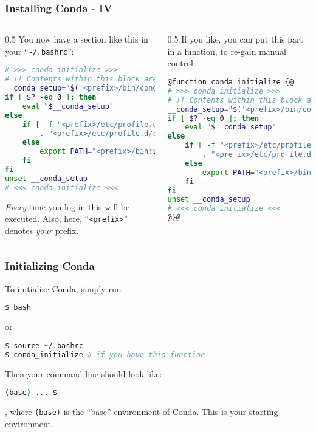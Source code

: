 \begin{frame}[fragile]
  \frametitle{Installing Conda - IV}
  \footnotesize
  \begin{columns}[t]
    \begin{column}{0.5\textwidth}
       You now have a section like this in your ``\texttt{\textasciitilde/.bashrc}'':
       \begin{lstlisting}[language=Bash, style=Shell, basicstyle=\tiny, breaklines=true]
# >>> conda initialize >>>
# !! Contents within this block are managed by 'conda init' !!
__conda_setup="$('<prefix>/bin/conda' 'shell.bash' 'hook' 2> /dev/null)"
if [ $? -eq 0 ]; then
    eval "$__conda_setup"
else
    if [ -f "<prefix>/etc/profile.d/conda.sh" ]; then
        . "<prefix>/etc/profile.d/conda.sh"
    else
        export PATH="<prefix>/bin:$PATH"
    fi
fi
unset __conda_setup
# <<< conda initialize <<<
      \end{lstlisting}
      \bcattention \emph{Every} time you log-in this will be executed. Also, here, ``\texttt{<prefix>}'' denotes \emph{your} prefix.
    \end{column}
    \begin{column}{0.5\textwidth}
       \pause
       If you like, you can put this part in a function, to re-gain manual control:
       \begin{lstlisting}[language=Bash, style=Shell, basicstyle=\tiny, breaklines=true]
@function conda_initialize {@
# >>> conda initialize >>>
# !! Contents within this block are managed by 'conda init' !!
__conda_setup="$('<prefix>/bin/conda' 'shell.bash' 'hook' 2> /dev/null)"
if [ $? -eq 0 ]; then
    eval "$__conda_setup"
else
    if [ -f "<prefix>/etc/profile.d/conda.sh" ]; then
        . "<prefix>/etc/profile.d/conda.sh"
    else
        export PATH="<prefix>/bin:$PATH"
    fi
fi
unset __conda_setup
# <<< conda initialize <<<
@}@
      \end{lstlisting}
    \end{column}
  \end{columns}

\end{frame}

\begin{frame}[fragile]
  \frametitle{Initializing Conda}
  To initialize Conda, simply run
  \begin{lstlisting}[language=Bash, style=Shell]
$ bash
  \end{lstlisting}
  or
  \begin{lstlisting}[language=Bash, style=Shell]
$ source ~/.bashrc
$ conda_initialize # if you have this function
  \end{lstlisting}
  Then your command line should look like:
  \begin{lstlisting}[language=Bash, style=Shell]
(base) ... $
  \end{lstlisting}
  , where \verb+(base)+ is the ``base'' environment of Conda. This is your starting environment.
\end{frame}

